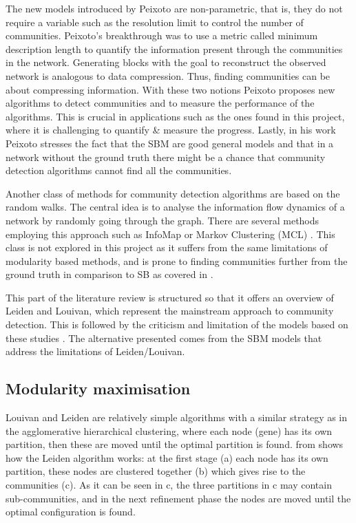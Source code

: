 The new models introduced by Peixoto are non-parametric, that is, they do not require a variable such as the resolution limit to control the number of communities. Peixoto's breakthrough was to use a metric called minimum description length to quantify the information present through the communities in the network. Generating blocks with the goal to reconstruct the observed network is analogous to data compression. Thus, finding communities can be about compressing information. With these two notions Peixoto proposes new algorithms to detect communities and to measure the performance of the algorithms. This is crucial in applications such as the ones found in this project, where it is challenging to quantify \& measure the progress. Lastly, in his work Peixoto stresses the fact that the SBM are good general models and that in a network without the ground truth there might be a chance that community detection algorithms cannot find all the communities.

Another class of methods for community detection algorithms are based on the random walks. The central idea is to analyse the information flow dynamics of a network by randomly going through the graph. There are several methods employing this approach such as InfoMap  \citep{Rosvall2008-kw} or Markov Clustering (MCL) \citep{Van_Dongen2008-yj}. This class is not explored in this project as it suffers from the same limitations of modularity based methods, and is prone to finding communities further from the ground truth in comparison to SB as covered in \cite{Peixoto2021-jx}.

This part of the literature review is structured so that it offers an overview of Leiden and Louivan, which represent the mainstream approach to community detection. This is followed by the criticism and limitation of the models based on these studies \citep{Peixoto2021-jx, Peixoto2023-rt, Shemirani2023-ww}. The alternative presented comes from the SBM models that address the limitations of Leiden/Louivan.


\subsection{Modularity maximisation} \label{s:lit:mod_max}

Louivan \citep{Blondel2008-ik} and Leiden \citep{Traag2019-ne} are relatively simple algorithms with a similar strategy as in the agglomerative hierarchical clustering, where each node (gene) has its own partition, then these are moved until the optimal partition is found.  from \cite{Traag2019-ne} shows how the Leiden algorithm works: at the first stage (a) each node has its own partition, these nodes are clustered together (b) which gives rise to the communities (c). As it can be seen in c, the three partitions in c may contain sub-communities, and in the next refinement phase the nodes are moved until the optimal configuration is found.

